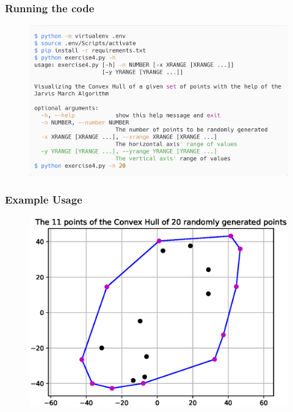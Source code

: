 \documentclass[12pt]{article}
\newenvironment{matlab}
	{\begin{figure}[H]\centering\captionsetup{justification=centering}}
	{\end{figure}}
\begin{document}
\pagebreak

\subsubsection*{Running the code}

\begin{matlab}
    \includegraphics[scale=0.140]{images/gift_wrapping_algorithm.png}
\end{matlab}

\subsubsection*{Example Usage}

\begin{matlab}
    \includegraphics[scale=1]{images/gift_wrapping_algorithm.eps}
\end{matlab}

\pagebreak
\end{document}
